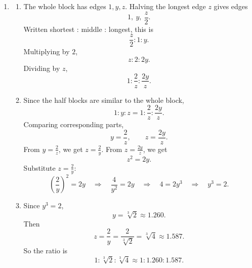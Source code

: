 \documentclass[11pt,a4paper]{article}
\begin{document}
\begin{enumerate}[label=\textbf{Q\arabic*.}, leftmargin=*, itemsep=1.2em]
\begin{enumerate}[label=(\alph*)]
\item Each of the three pieces has one third of the area of the whole triangle. The area scale factor from piece to whole is \(3\), so the length scale factor is \(\sqrt3\). Thus
\[
\text{piece}:\text{whole}=1:\sqrt3.
\]

\item The whole \(L\)-shape is made of \(12\) unit squares. Each of the four similar \(L\)-shapes is made of \(3\) unit squares. Hence each piece has \(\frac14\) of the area of the whole, so the length scale factor from piece to whole is
\[
\sqrt4=2.
\]
Thus
\[
\text{piece}:\text{whole}=1:2.
\]

\item If a shape is cut into \(n\) equal pieces, each similar to the whole, then each piece has area \(\frac1n\) of the whole area. If every length of the piece is multiplied by \(k\) to get the whole shape, then area is multiplied by \(k^2\). Hence
\[
k^2=n
\quad\Longrightarrow\quad
k=\sqrt n.
\]
So
\[
\text{piece}:\text{whole}=1:\sqrt n.
\]
For A4, cutting a sheet in half gives two A5 sheets. Each is similar to the original A4 sheet, and \(n=2\), so the ratio is
\[
1:\sqrt2.
\]
This gives another explanation of why A4 has ratio \(1:\sqrt2\).
\end{enumerate}

\item
\begin{enumerate}[label=(\alph*)]
\item The whole block has edges \(1,y,z\). Halving the longest edge \(z\) gives edges
\[
1,\ y,\ \frac z2.
\]
Written shortest : middle : longest, this is
\[
\frac z2:1:y.
\]
Multiplying by \(2\),
\[
z:2:2y.
\]
Dividing by \(z\),
\[
1:\frac2z:\frac{2y}{z}.
\]

\item Since the half blocks are similar to the whole block,
\[
1:y:z=1:\frac2z:\frac{2y}{z}.
\]
Comparing corresponding parts,
\[
y=\frac2z,
\qquad
z=\frac{2y}{z}.
\]
From \(y=\frac2z\), we get \(z=\frac2y\). From \(z=\frac{2y}{z}\), we get
\[
z^2=2y.
\]
Substitute \(z=\frac2y\):
\[
\left(\frac2y\right)^2=2y
\quad\Longrightarrow\quad
\frac4{y^2}=2y
\quad\Longrightarrow\quad
4=2y^3
\quad\Longrightarrow\quad
y^3=2.
\]

\item Since \(y^3=2\),
\[
y=\sqrt[3]{2}\approx 1.260.
\]
Then
\[
z=\frac2y=\frac2{\sqrt[3]{2}}=\sqrt[3]{4}\approx 1.587.
\]
So the ratio is
\[
1:\sqrt[3]{2}:\sqrt[3]{4}
\approx 1:1.260:1.587.
\]


\end{enumerate}
\end{enumerate}
\end{document}

